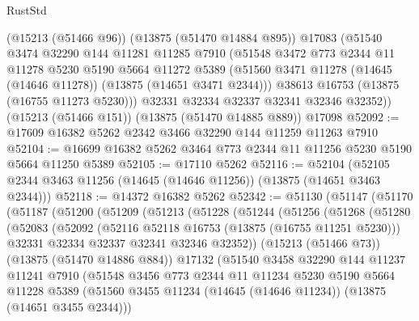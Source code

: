 \begin{lexlean}{RustStd}
\begin{coremodule}
      (@15213 (@51466 @96))
      (@13875 (@51470 @14884 @895))
      @17083
      (@51540
        @3474
        @32290
        @144
        @11281
        @11285
        @7910
        (@51548
          @3472
          @773
          @2344
          @11
          @11278
          @5230
          @5190
          @5664
          @11272
          @5389
          (@51560 @3471 @11278 (@14645 (@14646 @11278)) (@13875 (@14651 @3471 @2344)))
          @38613
          @16753
          (@13875 (@16755 @11273 @5230)))
        @32331
        @32334
        @32337
        @32341
        @32346
        @32352))
    (@15213 (@51466 @151))
    (@13875 (@51470 @14885 @889))
    @17098
@52092 := @17609 @16382 @5262 @2342 @3466 @32290 @144 @11259 @11263 @7910
@52104 := @16699 @16382 @5262 @3464 @773 @2344 @11 @11256 @5230 @5190 @5664 @11250 @5389
@52105 := @17110 @5262
@52116 := @52104 (@52105 @2344 @3463 @11256 (@14645 (@14646 @11256)) (@13875 (@14651 @3463 @2344)))
@52118 := @14372 @16382 @5262
@52342 := @51130
    (@51147
      (@51170
        (@51187
          (@51200
            (@51209
              (@51213
                (@51228
                  (@51244
                    (@51256
                      (@51268
                        (@51280
                          (@52083
                            (@52092
                              (@52116 @52118 @16753 (@13875 (@16755 @11251 @5230)))
                              @32331
                              @32334
                              @32337
                              @32341
                              @32346
                              @32352))
                          (@15213 (@51466 @73))
                          (@13875 (@51470 @14886 @884))
                          @17132
                          (@51540
                            @3458
                            @32290
                            @144
                            @11237
                            @11241
                            @7910
                            (@51548
                              @3456
                              @773
                              @2344
                              @11
                              @11234
                              @5230
                              @5190
                              @5664
                              @11228
                              @5389
                              (@51560
                                @3455
                                @11234
                                (@14645 (@14646 @11234))
                                (@13875 (@14651 @3455 @2344)))

\end{coremodule}
\end{lexlean}
